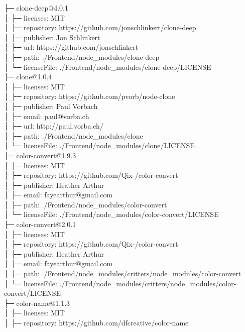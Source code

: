 ├─ clone-deep@4.0.1\\
│  ├─ licenses: MIT\\
│  ├─ repository: https://github.com/jonschlinkert/clone-deep\\
│  ├─ publisher: Jon Schlinkert\\
│  ├─ url: https://github.com/jonschlinkert\\
│  ├─ path: ./Frontend/node\_modules/clone-deep\\
│  └─ licenseFile: ./Frontend/node\_modules/clone-deep/LICENSE\\
├─ clone@1.0.4\\
│  ├─ licenses: MIT\\
│  ├─ repository: https://github.com/pvorb/node-clone\\
│  ├─ publisher: Paul Vorbach\\
│  ├─ email: paul@vorba.ch\\
│  ├─ url: http://paul.vorba.ch/\\
│  ├─ path: ./Frontend/node\_modules/clone\\
│  └─ licenseFile: ./Frontend/node\_modules/clone/LICENSE\\
├─ color-convert@1.9.3\\
│  ├─ licenses: MIT\\
│  ├─ repository: https://github.com/Qix-/color-convert\\
│  ├─ publisher: Heather Arthur\\
│  ├─ email: fayearthur@gmail.com\\
│  ├─ path: ./Frontend/node\_modules/color-convert\\
│  └─ licenseFile: ./Frontend/node\_modules/color-convert/LICENSE\\
├─ color-convert@2.0.1\\
│  ├─ licenses: MIT\\
│  ├─ repository: https://github.com/Qix-/color-convert\\
│  ├─ publisher: Heather Arthur\\
│  ├─ email: fayearthur@gmail.com\\
│  ├─ path: ./Frontend/node\_modules/critters/node\_modules/color-convert\\
│  └─ licenseFile: ./Frontend/node\_modules/critters/node\_modules/color-convert/LICENSE\\
├─ color-name@1.1.3\\
│  ├─ licenses: MIT\\
│  ├─ repository: https://github.com/dfcreative/color-name\\
